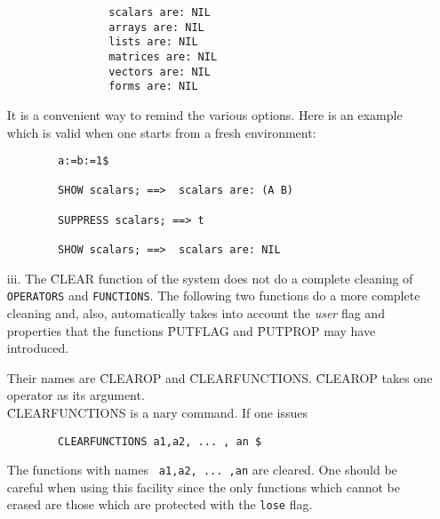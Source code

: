 \begin{itemize}
\begin{verbatim}
                scalars are: NIL
                arrays are: NIL
                lists are: NIL
                matrices are: NIL
                vectors are: NIL
                forms are: NIL
\end{verbatim}
It is a convenient way to remind the various options. Here is an example
which is valid when one starts from a fresh environment:
\begin{verbatim}
        a:=b:=1$

        SHOW scalars; ==>  scalars are: (A B)

        SUPPRESS scalars; ==> t

        SHOW scalars; ==>  scalars are: NIL
\end{verbatim}
\item[iii.]
The \f{CLEAR} function of the system does not do a complete cleaning of
\verb+OPERATORS+ and \verb+FUNCTIONS+. The following two functions do a more
complete cleaning and, also, automatically takes into account the
{\em user} flag and properties that the functions
\f{PUTFLAG} and \f{PUTPROP} may have introduced.

Their names are \f{CLEAROP} and \f{CLEARFUNCTIONS}.
\f{CLEAROP} takes one operator as its argument.\\
\f{CLEARFUNCTIONS} is a nary command. If one issues
\begin{verbatim}
        CLEARFUNCTIONS a1,a2, ... , an $
\end{verbatim}
The functions with names \verb+ a1,a2, ... ,an+  are cleared.
One should be careful when  using this facility since the
only functions which cannot be erased are those which are
protected with the \verb+lose+ flag.
\end{itemize}
